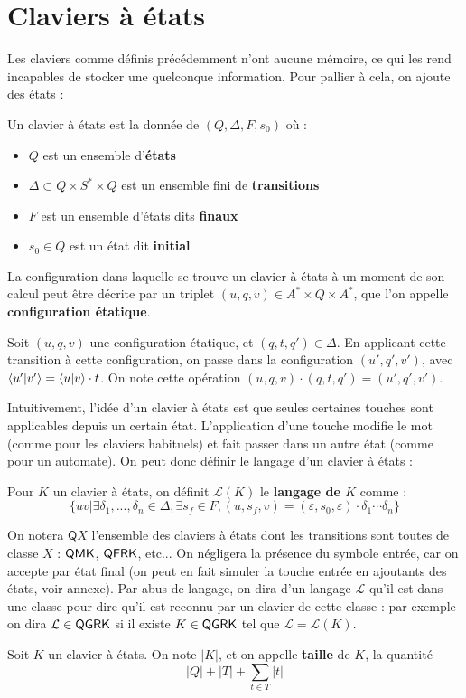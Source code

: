 \documentclass[12pt, a4paper]{article}
\renewcommand{\L}{\mathcal{L}}
\begin{document}
	\section{Claviers à états}
    Les claviers comme définis précédemment n'ont aucune mémoire, ce qui les rend incapables de stocker une quelconque information.
    Pour pallier à cela, on ajoute des états :
    \begin{defétats}
        Un clavier à états est la donnée de $(Q,\Delta ,F,s_0)$ où :
        \begin{itemize}
            \item $Q$ est un ensemble d'\textbf{états}
            \item $\Delta \subset Q \times S^* \times Q$ est un ensemble fini de \textbf{transitions}
            \item $F$ est un ensemble d'états dits \textbf{finaux}
            \item $s_0 \in Q$ est un état dit \textbf{initial}
        \end{itemize}
    \end{defétats}
    \begin{configétats}
        La configuration dans laquelle se trouve un clavier à états à un moment de son calcul peut être décrite par un triplet $(u,q,v) \in A^* \times Q \times A^*$, que l'on appelle \textbf{configuration étatique}.
    \end{configétats}
    
    Soit $(u,q,v)$ une configuration étatique, et $(q,t,q') \in \Delta$. En applicant cette transition à cette configuration, on passe dans la configuration $(u',q',v')$, avec $\left\langle u' \middle| v' \right\rangle = \left\langle u \middle| v \right\rangle \cdot t$.
    On note cette opération $(u,q,v) \cdot (q,t,q') = (u',q',v')$.

    Intuitivement, l'idée d'un clavier à états est que seules certaines touches sont applicables depuis un certain état. L'application d'une touche modifie le mot (comme pour les claviers habituels)
    et fait passer dans un autre état (comme pour un automate).
    On peut donc définir le langage d'un clavier à états :

    Pour $K$ un clavier à états, on définit $\L(K)$ le \textbf{langage de $K$} comme :
    \[ \{uv | \exists\delta_1,...,\delta_n \in \Delta, \exists s_f \in F, (u,s_f,v) = (\varepsilon,s_0,\varepsilon)\cdot\delta_1\cdots\delta_n \}\]

    On notera $\mathsf{Q}X$ l'ensemble des claviers à états dont les transitions sont toutes de classe $X$ : $\mathsf{QMK}$, $\mathsf{QFRK}$, etc... 
    On négligera la présence du symbole entrée, car on accepte par état final (on peut en fait simuler la touche entrée en ajoutants des états, voir annexe).
    Par abus de langage, on dira d'un langage $\L$ qu'il est dans une classe pour dire qu'il est reconnu par un clavier de cette classe : 
    par exemple on dira $\L \in \QGRK$ si il existe $K \in \mathsf{QGRK}$ tel que $\L = \L(K)$.
    \begin{tailleclavierQ}
        Soit $K$ un clavier à états. On note $|K|$, et on appelle \textbf{taille} de $K$, la quantité 
        \[ |Q| + |T| + \sum_{t \in T} |t|\]
    \end{tailleclavierQ}
\end{document}
